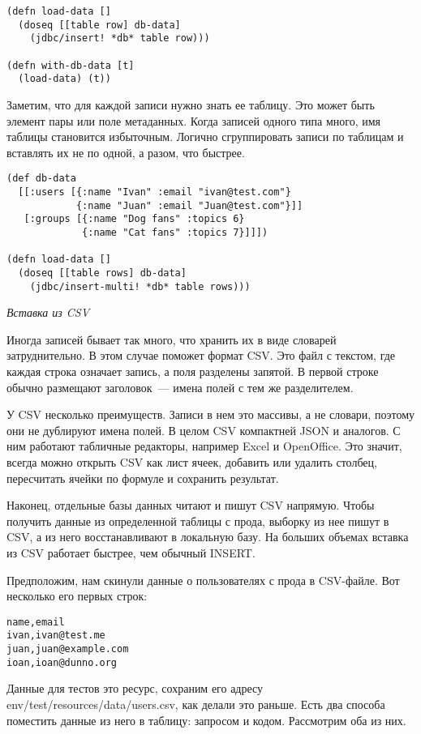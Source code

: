 \begin{verbatim}
(defn load-data []
  (doseq [[table row] db-data]
    (jdbc/insert! *db* table row)))

(defn with-db-data [t]
  (load-data) (t))
\end{verbatim}

Заметим, что для каждой записи нужно знать ее таблицу. Это может быть элемент
пары или поле метаданных. Когда записей одного типа много, имя таблицы
становится избыточным. Логично сгруппировать записи по таблицам и вставлять их
не по одной, а разом, что быстрее.

\begin{verbatim}
(def db-data
  [[:users [{:name "Ivan" :email "ivan@test.com"}
            {:name "Juan" :email "Juan@test.com"}]]
   [:groups [{:name "Dog fans" :topics 6}
             {:name "Cat fans" :topics 7}]]])

(defn load-data []
  (doseq [[table rows] db-data]
    (jdbc/insert-multi! *db* table rows)))
\end{verbatim}

\emph{Вставка из CSV}

Иногда записей бывает так много, что хранить их в виде словарей
затруднительно. В этом случае поможет формат CSV. Это файл с текстом, где каждая
строка означает запись, а поля разделены запятой. В первой строке обычно
размещают заголовок~--- имена полей с тем же разделителем.

У CSV несколько преимуществ. Записи в нем это массивы, а не словари, поэтому они
не дублируют имена полей. В целом CSV компактней JSON и аналогов. С ним работают
табличные редакторы, например Excel и OpenOffice. Это значит, всегда можно
открыть CSV как лист ячеек, добавить или удалить столбец, пересчитать ячейки по
формуле и сохранить результат.

Наконец, отдельные базы данных читают и пишут CSV напрямую. Чтобы получить
данные из определенной таблицы с прода, выборку из нее пишут в CSV, а из него
восстанавливают в локальную базу. На больших объемах вставка из CSV работает
быстрее, чем обычный INSERT.

Предположим, нам скинули данные о пользователях с прода в CSV-файле. Вот
несколько его первых строк:

\begin{verbatim}
name,email
ivan,ivan@test.me
juan,juan@example.com
ioan,ioan@dunno.org
\end{verbatim}

Данные для тестов это ресурс, сохраним его адресу
env/test/resources/data/users.csv, как делали это раньше. Есть два способа
поместить данные из него в таблицу: запросом и кодом. Рассмотрим оба из них.

